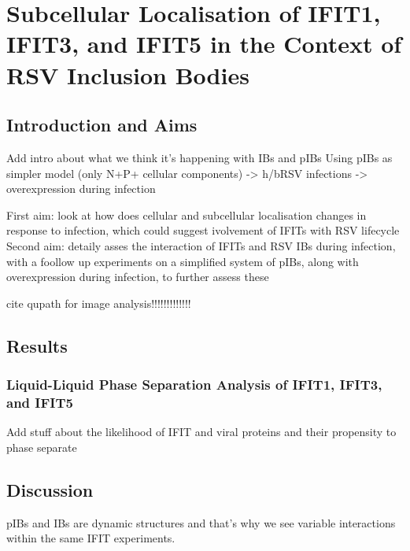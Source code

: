 \chapter{Subcellular Localisation of IFIT1, IFIT3, and IFIT5 in the Context of RSV Inclusion Bodies} \label{ch:Subcellular Localisation of IFIT1, IFIT3, and IFIT5 in the Context of RSV Inclusion Bodies}

\section{Introduction and Aims} \label{sec:Introduction and Aims-Chapter4}
Add intro about what we think it's happening with IBs and pIBs
Using pIBs as simpler model (only N+P+ cellular components) -> h/bRSV infections -> overexpression during infection

First aim: look at how does cellular and subcellular localisation changes in response to infection, which could suggest ivolvement of IFITs with RSV lifecycle
Second aim: detaily asses the interaction of IFITs and RSV IBs during infection, with a foollow up experiments on a simplified system of pIBs, along with overexpression during infection, to further assess these


cite qupath for image analysis!!!!!!!!!!!!!


\section{Results} \label{sec:Results-Chapter4}





\subsection{Liquid-Liquid Phase Separation Analysis of IFIT1, IFIT3, and IFIT5} \label{subsec:Liquid-Liquid Phase Separation Analysis of IFIT1, IFIT3, and IFIT5}
Add stuff about the likelihood of IFIT and viral proteins and their propensity to phase separate


\section{Discussion} \label{sec:Discussion-Chapter4}
pIBs and IBs are dynamic structures and that's why we see variable interactions within the same IFIT experiments.